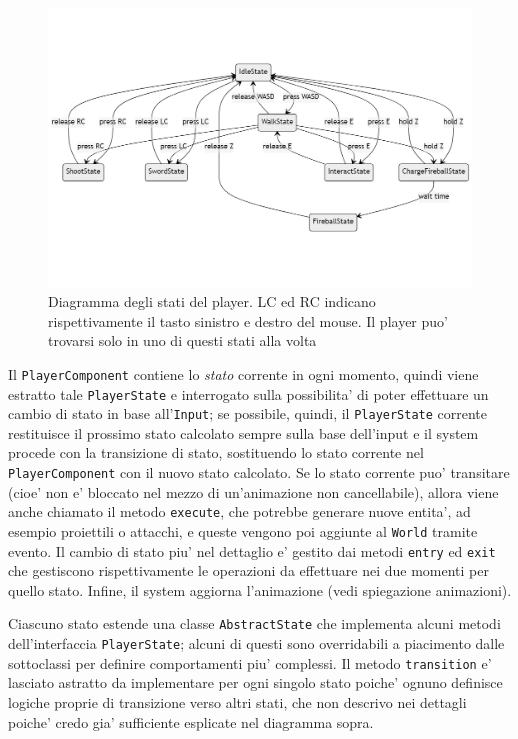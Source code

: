 \documentclass[a4paper,12pt]{report}
\begin{document}
\begin{figure}[h]
	\centering
	\includegraphics[width=\textwidth]{uml/player_states.png}
	\caption{Diagramma degli stati del player. LC ed RC indicano rispettivamente il tasto sinistro e destro del mouse. Il player puo' trovarsi solo in uno di questi stati alla volta} 
\end{figure}

Il \texttt{PlayerComponent} contiene lo \textit{stato} corrente in ogni momento, quindi viene estratto tale \texttt{PlayerState} e interrogato sulla possibilita' di poter effettuare un cambio di stato in base all'\texttt{Input}; se possibile, quindi, il \texttt{PlayerState} corrente restituisce il prossimo stato calcolato sempre sulla base dell'input e il system procede con la transizione di stato, sostituendo lo stato corrente nel \texttt{PlayerComponent} con il nuovo stato calcolato. Se lo stato corrente puo' transitare (cioe' non e' bloccato nel mezzo di un'animazione non cancellabile), allora viene anche chiamato il metodo \texttt{execute}, che potrebbe generare nuove entita', ad esempio proiettili o attacchi, e queste vengono poi aggiunte al \texttt{World} tramite evento. Il cambio di stato piu' nel dettaglio e' gestito dai metodi \texttt{entry} ed \texttt{exit} che gestiscono rispettivamente le operazioni da effettuare nei due momenti per quello stato. Infine, il system aggiorna l'animazione (vedi spiegazione animazioni). 

Ciascuno stato estende una classe \texttt{AbstractState} che implementa alcuni metodi dell'interfaccia \texttt{PlayerState}; alcuni di questi sono overridabili a piacimento dalle sottoclassi per definire comportamenti piu' complessi. Il metodo \texttt{transition} e' lasciato astratto da implementare per ogni singolo stato poiche' ognuno definisce logiche proprie di transizione verso altri stati, che non descrivo nei dettagli poiche' credo gia' sufficiente esplicate nel diagramma sopra.
\end{document}
